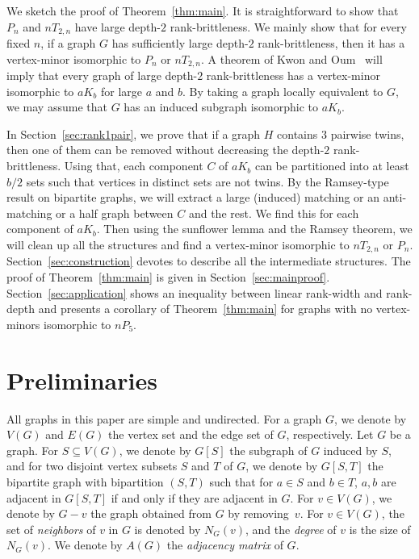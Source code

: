\documentclass[11pt]{article}
\begin{document}
	We sketch the proof of Theorem~\ref{thm:main}.
	It is straightforward to show that $P_n$ and $nT_{2,n}$ have large depth-$2$ rank-brittleness.
	We mainly show that for every fixed $n$,
	if a graph $G$ has sufficiently large depth-$2$ rank-brittleness, 
	then it has a vertex-minor isomorphic to  $P_n$ or $nT_{2,n}$. 
        A theorem of Kwon and Oum~\cite{KO2018sca}
        will imply that every graph of large depth-$2$ rank-brittleness
        has a vertex-minor isomorphic to $aK_b$
        for large $a$ and $b$.
        By taking a graph locally equivalent to $G$, we may assume that
        $G$ has an induced subgraph isomorphic to $aK_b$.
	
	In Section~\ref{sec:rank1pair}, we prove that if a graph $H$ contains $3$
        pairwise twins, then
        one of them can be removed without decreasing the depth-$2$ rank-brittleness.
        Using that, each component $C$ of $aK_b$ can be partitioned into
        at least $b/2$ sets such that vertices in distinct sets are not twins.
	By the Ramsey-type result on bipartite graphs,
        we will extract a large (induced) matching or an anti-matching or a half graph between 
	$C$ and the rest. We find this for each component of $aK_b$.
        Then using the sunflower lemma and the Ramsey theorem,
        we will clean up all the structures and find a vertex-minor isomorphic to $nT_{2,n}$ or $P_n$.
	Section~\ref{sec:construction} devotes to describe all the intermediate structures.
	The proof of Theorem~\ref{thm:main} is given in Section~\ref{sec:mainproof}.
        Section~\ref{sec:application} shows an inequality between linear rank-width and rank-depth and presents a corollary of Theorem~\ref{thm:main} for graphs with no vertex-minors isomorphic to $nP_5$.
			
		\section{Preliminaries}\label{sec:prelim}
		
		All graphs in this paper are simple and undirected. 
		For a graph $G$, we denote by $V(G)$ and $E(G)$ the vertex set and the edge set of $G$, respectively. 
		Let $G$ be a graph.
	For $S\subseteq V(G)$, we denote by $G[S]$ the subgraph of $G$ induced by $S$, and  
	for two disjoint vertex subsets $S$ and $T$ of $G$, 
	we denote by $G[S,T]$ the bipartite graph with bipartition $(S,T)$ such that 
	for $a\in S$ and $b\in T$, $a,b$ are adjacent in $G[S,T]$ if and only if they are adjacent in $G$.
	For $v\in V(G)$, we denote by $G- v$ the graph obtained from $G$ by removing~$v$. 
	For $v\in V(G)$, the set of \emph{neighbors} of $v$ in $G$ is denoted by $N_G(v)$, and the \emph{degree} of $v$ is the size of $N_G(v)$.
	We denote by $A(G)$ the \emph{adjacency matrix} of $G$.
	
\end{document}
